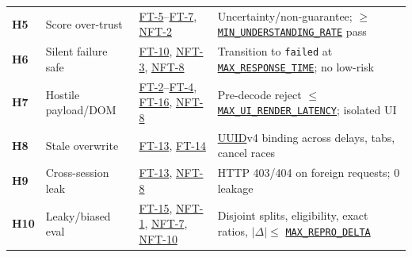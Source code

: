 \documentclass[12pt, titlepage]{article}
\newcommand{\MinUnderstandingRate}{\hyperref[const:MIN_UNDERSTANDING_RATE]{\texttt{MIN\_\allowbreak{}UNDERSTANDING\_\allowbreak{}RATE}}}
\newcommand{\MaxResponseTime}{\hyperref[const:MAX_RESPONSE_TIME]{\texttt{MAX\_\allowbreak{}RESPONSE\_\allowbreak{}TIME}}}
\newcommand{\MaxReproDelta}{\hyperref[const:MAX_REPRO_DELTA]{\texttt{MAX\_\allowbreak{}REPRO\_\allowbreak{}DELTA}}}
\newcommand{\MaxUiRenderLatency}{\hyperref[const:MAX_UI_RENDER_LATENCY]{\texttt{MAX\_\allowbreak{}UI\_\allowbreak{}RENDER\_\allowbreak{}LATENCY}}}
\newcommand{\UUID}{\hyperlink{vnv-acr-uuid}{UUID}}
\begin{document}
\begin{tabularx}{\textwidth}{P{1.9cm} P{3.7cm} P{3.5cm} Y}
\label{haz:H5}\textbf{H5} & Score over-trust & \hyperref[test:FT-5]{FT-5}--\hyperref[test:FT-7]{FT-7}, \hyperref[test:NFT-2]{NFT-2} & Uncertainty/non-guarantee; $\ge$ \MinUnderstandingRate{} pass\\
\label{haz:H6}\textbf{H6} & Silent failure safe & \hyperref[test:FT-10]{FT-10}, \hyperref[test:NFT-3]{NFT-3}, \hyperref[test:NFT-8]{NFT-8} & Transition to \texttt{failed} at \MaxResponseTime{}; no low-risk\\
\label{haz:H7}\textbf{H7} & Hostile payload/DOM & \hyperref[test:FT-2]{FT-2}--\hyperref[test:FT-4]{FT-4}, \hyperref[test:FT-16]{FT-16}, \hyperref[test:NFT-8]{NFT-8} & Pre-decode reject $\le$ \MaxUiRenderLatency{}; isolated UI\\
\label{haz:H8}\textbf{H8} & Stale overwrite & \hyperref[test:FT-13]{FT-13}, \hyperref[test:FT-14]{FT-14} & \UUID{}v4 binding across delays, tabs, cancel races\\
\label{haz:H9}\textbf{H9} & Cross-session leak & \hyperref[test:FT-13]{FT-13}, \hyperref[test:NFT-8]{NFT-8} & HTTP 403/404 on foreign requests; 0 leakage\\
\label{haz:H10}\textbf{H10} & Leaky/biased eval & \hyperref[test:FT-15]{FT-15}, \hyperref[test:NFT-1]{NFT-1}, \hyperref[test:NFT-7]{NFT-7}, \hyperref[test:NFT-10]{NFT-10} & Disjoint splits, eligibility, exact ratios, $|\Delta| \le$ \MaxReproDelta{}\\
\end{tabularx}
\endgroup
\end{document}
